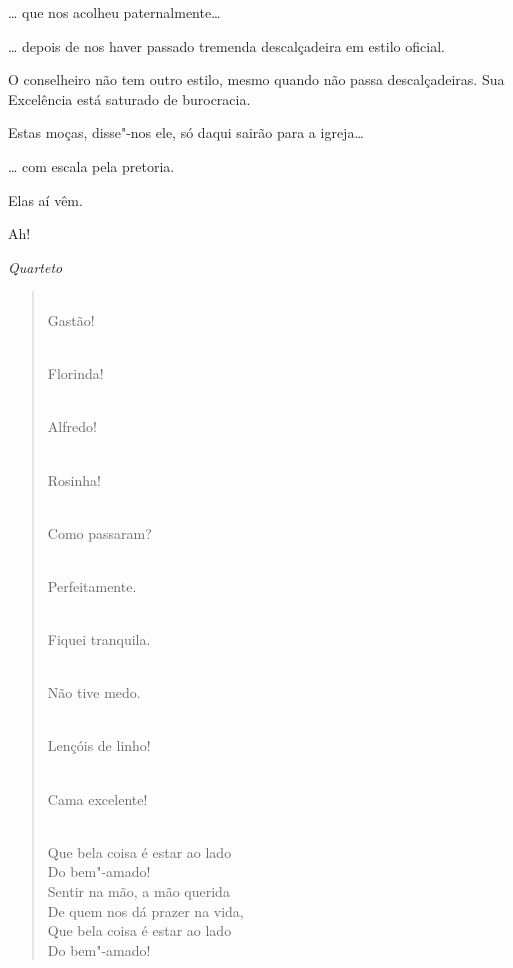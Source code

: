 \begin{linenumbers}
 \ldots{} que nos acolheu paternalmente\ldots{}

 \ldots{} depois de nos haver passado tremenda descalçadeira em
estilo oficial.

 O conselheiro não tem outro estilo, mesmo quando não passa
descalçadeiras. Sua Excelência está saturado de burocracia.

 Estas moças, disse"-nos ele, só daqui sairão para a igreja\ldots{}

 \ldots{} com escala pela pretoria.

 Elas aí vêm.

 Ah!


{\smallskip\raggedleft\itshape Quarteto\par}
\begin{verse}
\\
Gastão!

\\
Florinda!

\\
Alfredo!

\\
Rosinha!

\\
Como passaram?

\\
Perfeitamente.

\\
Fiquei tranquila.

\\
Não tive medo.


\\
Lençóis de linho!

\\
Cama excelente!

\\
Que bela coisa é estar ao lado\\
Do bem"-amado!\\
Sentir na mão, a mão querida\\
De quem nos dá prazer na vida,\\
Que bela coisa é estar ao lado\\
Do bem"-amado!


\end{verse}
\end{linenumbers}
